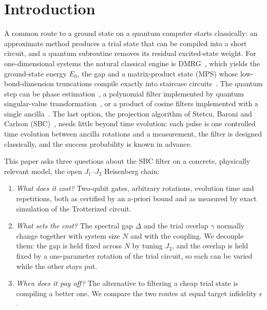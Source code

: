 \documentclass[aps,pra,twocolumn,superscriptaddress,nofootinbib]{revtex4-2}
\begin{document}
\maketitle

\section{Introduction}

A common route to a ground state on a quantum computer starts classically: an approximate method
produces a trial state that can be compiled into a short circuit, and a quantum subroutine removes its
residual excited-state weight. For one-dimensional systems the natural classical engine is
DMRG~\cite{White1992,Schollwock2011}, which yields the ground-state energy $E_0$, the gap and a
matrix-product state (MPS) whose low-bond-dimension truncations compile exactly into staircase
circuits~\cite{Ran2020}. The quantum step can be phase estimation~\cite{Ge2019}, a polynomial filter
implemented by quantum singular-value transformation~\cite{Lin2020,Gilyen2019,Dong2022}, or a product of
cosine filters implemented with a single ancilla~\cite{Stetcu2023,Choi2021}. The last option, the projection
algorithm of Stetcu, Baroni and Carlson (SBC)~\cite{Stetcu2023}, needs little beyond time evolution: each
pulse is one controlled time evolution between ancilla rotations and a measurement, the filter is designed
classically, and the success probability is known in advance.

This paper asks three questions about the SBC filter on a concrete, physically relevant model, the open
$J_1$--$J_2$ Heisenberg chain:
\begin{enumerate}
\item \emph{What does it cost?} Two-qubit gates, arbitrary rotations, evolution time and repetitions, both as
certified by an a-priori bound and as measured by exact simulation of the Trotterized circuit.
\item \emph{What sets the cost?} The spectral gap $\Delta$ and the trial overlap $\gamma$ normally change
together with system size $N$ and with the coupling. We decouple them: the gap is held fixed across $N$
by tuning $J_2$, and the overlap is held fixed by a one-parameter rotation of the trial circuit, so each can
be varied while the other stays put.
\item \emph{When does it pay off?} The alternative to filtering a cheap trial state is compiling a better
one. We compare the two routes at equal target infidelity $\epsilon$.
\end{enumerate}
\end{document}
